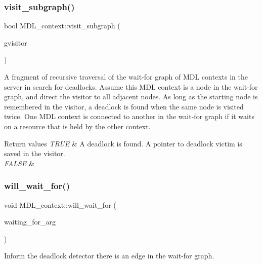 \subsubsection{\texorpdfstring{visit\+\_\+subgraph()}{visit\_subgraph()}}
{\footnotesize\ttfamily bool M\+D\+L\+\_\+context\+::visit\+\_\+subgraph (\begin{DoxyParamCaption}\item[{\mbox{\hyperlink{classMDL__wait__for__graph__visitor}{M\+D\+L\+\_\+wait\+\_\+for\+\_\+graph\+\_\+visitor}} $\ast$}]{gvisitor }\end{DoxyParamCaption})}

A fragment of recursive traversal of the wait-\/for graph of M\+DL contexts in the server in search for deadlocks. Assume this M\+DL context is a node in the wait-\/for graph, and direct the visitor to all adjacent nodes. As long as the starting node is remembered in the visitor, a deadlock is found when the same node is visited twice. One M\+DL context is connected to another in the wait-\/for graph if it waits on a resource that is held by the other context.


\begin{DoxyRetVals}{Return values}
{\em T\+R\+UE} & A deadlock is found. A pointer to deadlock victim is saved in the visitor. \\
\hline
{\em F\+A\+L\+SE} & \\
\hline
\end{DoxyRetVals}
\mbox{\label{classMDL__context_afd74a4227cf8ddea993d96ee3be25331}} 
\subsubsection{\texorpdfstring{will\+\_\+wait\+\_\+for()}{will\_wait\_for()}}
{\footnotesize\ttfamily void M\+D\+L\+\_\+context\+::will\+\_\+wait\+\_\+for (\begin{DoxyParamCaption}\item[{\mbox{\hyperlink{classMDL__wait__for__subgraph}{M\+D\+L\+\_\+wait\+\_\+for\+\_\+subgraph}} $\ast$}]{waiting\+\_\+for\+\_\+arg }\end{DoxyParamCaption})\hspace{0.3cm}{\ttfamily [inline]}}

Inform the deadlock detector there is an edge in the wait-\/for graph. 

